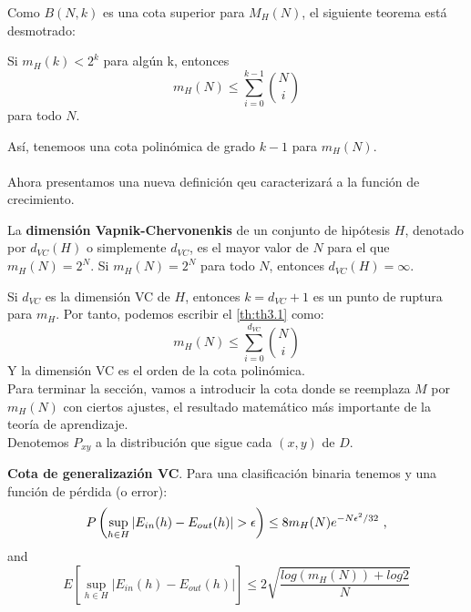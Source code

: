 Como $B(N,k)$ es una cota superior para $M_{H}(N)$, el siguiente teorema está desmotrado:
\begin{teorema}\label{th:th3.1}
Si $m_{H}(k)<2^{k}$ para algún k, entonces
\[ m_{H}(N) \leq \sum_{i=0}^{k-1} \binom{N}{i} \]
para todo $N$.
\end{teorema}
Así, tenemoos una cota polinómica de grado $k-1$ para $m_{H}(N)$.\cite{abu2012learning}\\\\
Ahora presentamos una nueva definición qeu caracterizará a la función de crecimiento.
\begin{definicion}
La \textbf{dimensión Vapnik-Chervonenkis} de un conjunto de hipótesis $H$, denotado por $d_{VC}(H)$ o simplemente $d_{VC}$, es el mayor valor de $N$ para el que $m_{H}(N)=2^{N}$. Si $m_{H}(N)=2^{N}$ para todo $N$, entonces $d_{VC}(H)=\infty$.
\end{definicion}
Si $d_{VC}$ es la dimensión VC de $H$, entonces $k=d_{VC}+1$ es un punto de ruptura para $m_{H}$. Por tanto, podemos escribir el \autoref{th:th3.1} como:
\[  m_{H}(N) \leq \sum_{i=0}^{d_{VC}} \binom{N}{i} \]
Y la dimensión VC es el orden de la cota polinómica.\\
Para terminar la sección, vamos a introducir la cota donde se reemplaza $M$ por $m_{H}(N)$ con ciertos ajustes, el resultado matemático más importante de la teoría de aprendizaje. \cite{abu2012learning}\\
Denotemos $P_{xy}$ a la distribución que sigue cada $(x,y)$ de $D$.
\begin{teorema}
\textbf{Cota de generalizazión VC}. Para una clasificación binaria tenemos y una función de pérdida (o error):
\[ P \left( \sup_{h \in H} \vert E_{in}(h)-E_{out}(h) \vert > \epsilon \right) \leq 8m_{H}(N)e^{-N \epsilon^{2}/32} \textnormal{ ,} \]
and
\[ E \left[ \sup_{h \in H} \vert E_{in}(h)-E_{out}(h) \vert \right] \leq 2 \sqrt{\frac{log(m_{H}(N))+log2}{N}} \]
\end{teorema}
